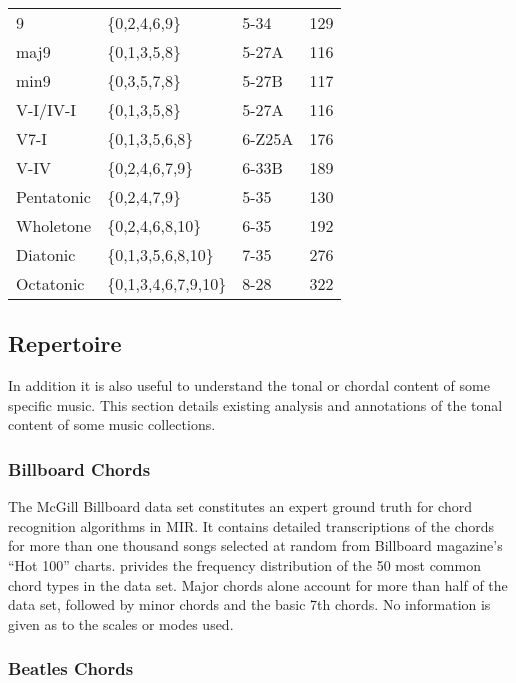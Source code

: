 \documentclass{article}
\begin{document}
\begin{table}[htb]
\begin{center}
\begin{tabular}{lllr}
\hline
 9           &  \{0,2,4,6,9\}         &  5-34        &    129  \\
 maj9        &  \{0,1,3,5,8\}         &  5-27A       &    116  \\
 min9        &  \{0,3,5,7,8\}         &  5-27B       &    117  \\
\hline
 V-I/IV-I    &  \{0,1,3,5,8\}         &  5-27A       &    116  \\
 V7-I        &  \{0,1,3,5,6,8\}       &  6-Z25A      &    176  \\
 V-IV        &  \{0,2,4,6,7,9\}       &  6-33B       &    189  \\
\hline
 Pentatonic  &  \{0,2,4,7,9\}         &  5-35        &    130  \\
 Wholetone   &  \{0,2,4,6,8,10\}      &  6-35        &    192  \\
 Diatonic    &  \{0,1,3,5,6,8,10\}    &  7-35        &    276  \\
 Octatonic   &  \{0,1,3,4,6,7,9,10\}  &  8-28        &    322  \\
\hline
\end{tabular}
\end{center}
\end{table}
\subsection{Repertoire}
\label{sec-7-2}

In addition it is also useful to understand the tonal or chordal
content of some specific music. This section details existing analysis
and annotations of the tonal content of some music collections.
\subsubsection{Billboard Chords}
\label{sec-7-2-1}

The McGill Billboard data set constitutes an expert ground truth for
chord recognition algorithms in MIR. It contains detailed
transcriptions of the chords for more than one thousand songs selected
at random from Billboard magazine’s “Hot 100”
charts. \citet[pp. 637]{Burgoyne2011} privides the frequency
distribution of the 50 most common chord types in the data set. Major
chords alone account for more than half of the data set, followed by
minor chords and the basic 7th chords. No information is given as to
the scales or modes used.
\subsubsection{Beatles Chords}
\label{sec-7-2-2}
\end{document}
